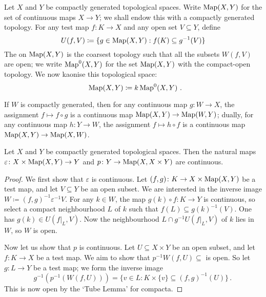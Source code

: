 \begin{cnstr}
	Let $ X $ and $ Y $ be compactly generated topological spaces.
	Write $ \operatorname{Map}(X, Y) $ for the set of continuous maps $ X \to Y $;
	we shall endow this with a compactly generated topology. 
	For any test map $ f \colon K \to X $ and any open set $ V \subseteq Y $, define
	\[
		U(f, V) \coloneq \{ g \in \operatorname{Map}(X, Y) : f(K) \subseteq g^{-1}(V) \}
	\]
	The  on $ \operatorname{Map}(X, Y) $ is the coarsest topology such that all the subsets $ W(f, V) $ are open;
	we write $ \operatorname{Map}^0(X, Y) $ for the set $ \operatorname{Map}(X, Y) $ with the compact-open topology.
	We now kaonise this topological space:
	\[
		\Map(X, Y) \coloneq k\Map^0(X, Y) \period
	\]

	If $ W $ is compactly generated, then for any continuous map $ g \colon W \to X $, the assignment $ f \mapsto f \circ g $ is a continuous map $ \operatorname{Map}( X, Y ) \to \operatorname{Map}( W, Y ) $;
	dually, for any continuous map $ h \colon Y \to W $, the assignment $ f \mapsto h \circ f $ is a continuous map $ \operatorname{Map}( X, Y ) \to \operatorname{Map}( X, W ) $.
\end{cnstr}

\begin{lem}
	Let $ X $ and $ Y $ be compactly generated topological spaces.
	Then the natural maps $ \varepsilon \colon X \times \operatorname{Map}( X, Y ) \to Y $ and $ p \colon Y \to \operatorname{Map}( X, X \times Y ) $ are continuous.
\end{lem}

\begin{proof}
	We first show that $\varepsilon$ is continuous.
	Let $ ( f, g ) \colon K \to X \times \operatorname{Map}( X, Y ) $ be a test map, and let $ V \subseteq Y $ be an open subset.
	We are interested in the inverse image $ W \coloneq ( f, g )^{-1}\varepsilon^{-1} V $.
	For any $ k \in W $, the map $ g(k) \circ f \colon K \to Y $ is continuous, so select a compact neighbourhood $ L $ of $ k $ such that $ f(L) \subseteq g(k)^{-1}(V) $.
	One has $ g(k) \in U(f|_L, V) $.
	Now the neighbourhood $ L \cap g^{-1}U(f|_L, V) $ of $ k $ lies in $ W $, so $ W $ is open.

	Now let us show that $ p $ is continuous.
	Let $ U \subseteq X \times Y $ be an open subset, and let $ f \colon K \to X $ be a test map.
	We aim to show that $ p^{-1} W(f, U) \subseteq $ is open.
	So let $ g \colon L \to Y $ be a test map;
	we form the inverse image
	\[
		g^{-1}(p^{-1}(W(f, U))) = \{ v \in L : K \times \{v\} \subseteq (f, g)^{-1}(U) \} \period
	\]
	This is now open by the `Tube Lemma' for compacta.
\end{proof}

